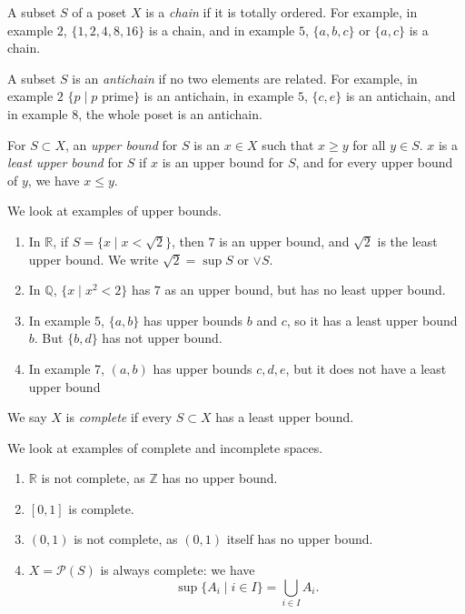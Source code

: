 \documentclass[12pt]{article}
\begin{document}
A subset $S$ of a poset $X$ is a \emph{chain} if it is totally ordered. For example, in example $2$, $\{1, 2, 4, 8, 16\}$ is a chain, and in example $5$, $\{a, b, c\}$ or $\{a, c\}$ is a chain.

A subset $S$ is an \emph{antichain} if no two elements are related. For example, in example $2$ $\{p \mid p \text{ prime} \}$ is an antichain, in example $5$, $\{c, e\}$ is an antichain, and in example 8, the whole poset is an antichain.

For $S \subset X$, an \emph{upper bound} for $S$ is an $x \in X$ such that $x \geq y$ for all $y \in S$. $x$ is a \emph{least upper bound} for $S$ if $x$ is an upper bound for $S$, and for every upper bound of $y$, we have $x \leq y$.

\begin{exbox}
	We look at examples of upper bounds.
	\begin{enumerate}
		\item In $\mathbb{R}$, if $S = \{x \mid x < \sqrt{2}\}$, then $7$ is an upper bound, and $\sqrt 2$ is the least upper bound. We write $\sqrt 2 = \sup S$ or $\vee S$.
		\item In $\mathbb{Q}$, $\{x \mid x^2 < 2\}$ has $7$ as an upper bound, but has no least upper bound.
		\item In example 5, $\{a, b\}$ has upper bounds $b$ and $c$, so it has a least upper bound $b$. But $\{b, d\}$ has not upper bound.
		\item In example 7, $(a, b)$ has upper bounds $c, d, e$, but it does not have a least upper bound
	\end{enumerate}
\end{exbox}

We say $X$ is \emph{complete} if every $S \subset X$ has a least upper bound.

\begin{exbox}
	We look at examples of complete and incomplete spaces.
	\begin{enumerate}
		\item $\mathbb{R}$ is not complete, as $\mathbb{Z}$ has no upper bound.
		\item $[0, 1]$ is complete.
		\item $(0, 1)$ is not complete, as $(0, 1)$ itself has no upper bound.
		\item $X = \mathcal{P}(S)$ is always complete: we have
			\[
				\sup \{A_i \mid i \in I\} = \bigcup_{i \in I} A_i
			.\]
	\end{enumerate}
\end{exbox}
\end{document}
